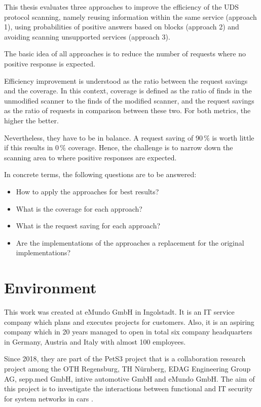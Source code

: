 This thesis evaluates three approaches to improve the efficiency of the UDS protocol scanning, namely reusing information within the same service (approach 1), using probabilities of positive answers based on blocks (approach 2) and avoiding scanning unsupported services (approach 3).

The basic idea of all approaches is to reduce the number of requests where no positive response is expected.

Efficiency improvement is understood as the ratio between the request savings and the coverage. In this context, coverage is defined as the ratio of finds in the unmodified scanner to the finds of the modified scanner, and the request savings as the ratio of requests in comparison between these two. For both metrics, the higher the better.

Nevertheless, they have to be in balance. A request saving of 90\,\% is worth little if this results in 0\,\% coverage. Hence, the challenge is to narrow down the scanning area to where positive responses are expected.

In concrete terms, the following questions are to be answered:

\begin{itemize}
    \item How to apply the approaches for best results?
    \item What is the coverage for each approach?
    \item What is the request saving for each approach?
    \item Are the implementations of the approaches a replacement for the original implementations?
\end{itemize}


\section{Environment}
This work was created at eMundo GmbH in Ingolstadt. It is an IT service company which plans and executes projects for customers. Also, it is an aspiring company which in 20 years managed to open in total six company headquarters in Germany, Austria and Italy with almost 100 employees.

Since 2018, they are part of the PetS3 project that is a collaboration research project among the OTH Regensburg, TH Nürnberg, EDAG Engineering Group AG, sepp.med GmbH, intive automotive GmbH and eMundo GmbH. The aim of this project is to investigate the interactions between functional and IT security for system networks in cars \cite{pets3}.

